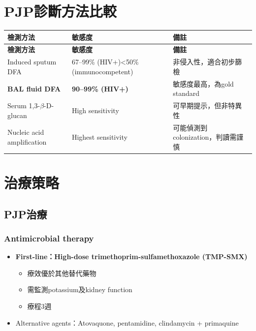 \documentclass[12pt,a4paper]{article}
\begin{document}
\section{PJP診斷方法比較}

\begin{longtable}{p{4cm}p{5cm}p{5cm}}
\toprule
\textbf{檢測方法} & \textbf{敏感度} & \textbf{備註} \\
\midrule
\endfirsthead
\toprule
\textbf{檢測方法} & \textbf{敏感度} & \textbf{備註} \\
\midrule
\endhead
\bottomrule
\endfoot
Induced sputum DFA & 67--99\% (HIV+)\newline <50\% (immunocompetent) & 非侵入性，適合初步篩檢 \\
\textbf{BAL fluid DFA} & \textbf{90--99\% (HIV+)} & 敏感度最高，為gold standard \\
Serum 1,3-$\beta$-D-glucan & High sensitivity & 可早期提示，但非特異性 \\
Nucleic acid amplification & Highest sensitivity & 可能偵測到colonization，\newline 判讀需謹慎 \\
\end{longtable}


\section{治療策略}

\subsection{PJP治療}

\subsubsection{Antimicrobial therapy}
\begin{itemize}
    \item \textbf{First-line：High-dose trimethoprim-sulfamethoxazole (TMP-SMX)}
    \begin{itemize}
        \item 療效優於其他替代藥物
        \item 需監測potassium及kidney function
        \item 療程3週
    \end{itemize}
    \item Alternative agents：Atovaquone, pentamidine, clindamycin + primaquine
\end{itemize}
\end{document}
